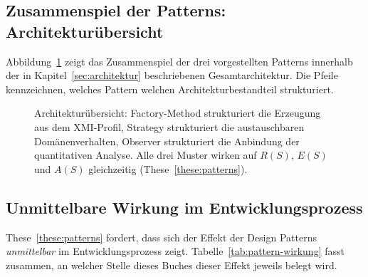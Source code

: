﻿\documentclass[a4paper,12pt]{report}
\theoremstyle{definition}
\begin{document}
\subsection{Zusammenspiel der Patterns: Architekturübersicht}

Abbildung~\ref{fig:pattern-architektur} zeigt das Zusammenspiel der drei
vorgestellten Patterns innerhalb der in Kapitel~\ref{sec:architektur}
beschriebenen Gesamtarchitektur. Die Pfeile kennzeichnen, welches Pattern
welchen Architekturbestandteil strukturiert.

\begin{figure}[H]
\centering
{}
\caption{Architekturübersicht: Factory-Method strukturiert die Erzeugung aus
dem XMI-Profil, Strategy strukturiert die austauschbaren Domänenverhalten,
Observer strukturiert die Anbindung der quantitativen Analyse. Alle drei
Muster wirken auf $R(S)$, $E(S)$ und $A(S)$ gleichzeitig (These~\ref{these:patterns}).}
\label{fig:pattern-architektur}
\end{figure}

\subsection{Unmittelbare Wirkung im Entwicklungsprozess}

These~\ref{these:patterns} fordert, dass sich der Effekt der Design Patterns
\emph{unmittelbar} im Entwicklungsprozess zeigt. Tabelle~\ref{tab:pattern-wirkung}
fasst zusammen, an welcher Stelle dieses Buches dieser Effekt jeweils belegt wird.
\end{document}
